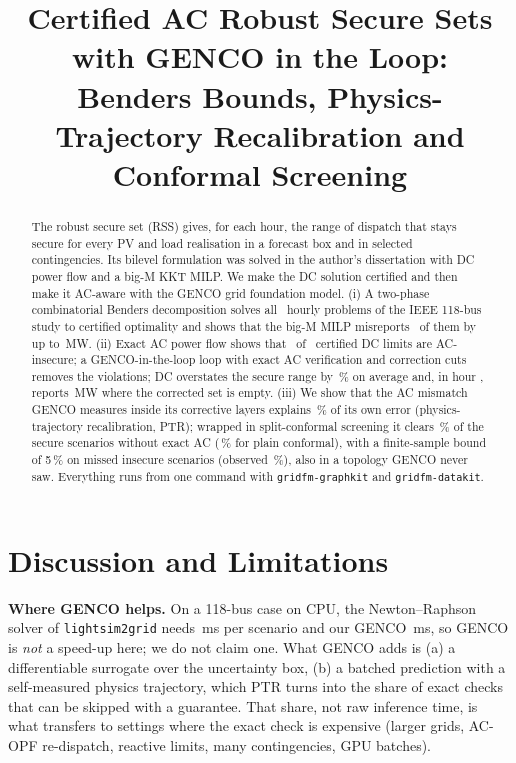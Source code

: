 \documentclass[conference]{IEEEtran}
\theoremstyle{remark}
\begin{document}
\sloppy
\title{Certified AC Robust Secure Sets with GENCO in the Loop:\\
Benders Bounds, Physics-Trajectory Recalibration and Conformal Screening}

\author{
}
\maketitle

\begin{abstract}
The robust secure set (RSS) gives, for each hour, the range of dispatch that stays
secure for every PV and load realisation in a forecast box and in selected
contingencies. Its bilevel formulation was solved in the author's dissertation with DC
power flow and a big-M KKT MILP. We make the DC solution certified and then make it
AC-aware with the GENCO grid foundation model. (i) A two-phase combinatorial Benders
decomposition solves all \NEbProblems\ hourly problems of the IEEE 118-bus study to
certified optimality and shows that the big-M MILP misreports \NBigmErrN\ of them by up
to \NBigmErrMaxMw\,MW. (ii) Exact AC power flow shows that \NItbDcBoundaryInsecure\ of
\NItbN\ certified DC limits are AC-insecure; a GENCO-in-the-loop loop with exact AC
verification and correction cuts removes the violations; DC overstates the secure range
by \NEeWidthRedMeanPct\,\% on average and, in hour \NEeEmptyHourList, reports
\NEeEmptyDcWidthMw\,MW where the corrected set is empty. (iii) We show that the AC mismatch GENCO measures inside its
corrective layers explains \NPtrMaeRedPct\,\% of its own error (physics-trajectory
recalibration, PTR); wrapped in split-conformal screening it clears \NClearPtrAaf\,\% of
the secure scenarios without exact AC (\NClearPlainAaf\,\% for plain conformal), with a
finite-sample bound of 5\,\% on missed insecure scenarios (observed \NMissPtrAaf\,\%),
also in a topology GENCO never saw. Everything runs from one command with
\texttt{gridfm-graphkit} and \texttt{gridfm-datakit}.
\end{abstract}






\section{Discussion and Limitations}
\textbf{Where GENCO helps.} On a 118-bus case on CPU, the Newton--Raphson solver of
\texttt{lightsim2grid} needs \NAcMs\,ms per scenario and our GENCO \NGencoMs\,ms, so
GENCO is \emph{not} a speed-up here; we do not claim one. What GENCO adds is (a) a
differentiable surrogate over the uncertainty box, (b) a batched prediction with a
self-measured physics trajectory, which PTR turns into the share of exact checks that
can be skipped with a guarantee. That share, not raw inference time, is what transfers
to settings where the exact check is expensive (larger grids, AC-OPF re-dispatch,
reactive limits, many contingencies, GPU batches).
\end{document}
